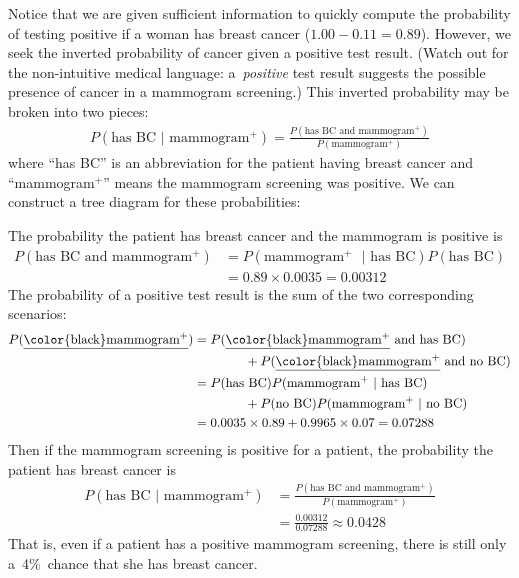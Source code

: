 \begin{examplewrap}
\begin{nexample}
Notice that we are given sufficient information to quickly compute the probability of testing positive if a woman has breast cancer ($1.00-0.11=0.89$). However, we seek the inverted probability of cancer given a positive test result. (Watch out for the non-intuitive medical language: a~\emph{positive} test result suggests the possible presence of cancer in a mammogram screening.) This inverted probability may be broken into two pieces:
\begin{align*}
P(\text{has BC } | \text{ mammogram$^+$}) = \frac{P(\text{has BC and mammogram$^+$})}{P(\text{mammogram$^+$})}
\end{align*}
where ``has BC'' is an abbreviation for the patient having
breast cancer and ``mammogram$^+$'' means the mammogram screening
was positive.
We can construct a tree diagram for these probabilities:
\begin{center}
\end{center}
The probability the patient has breast cancer
and the mammogram is positive is
\begin{align*}
P(\text{has BC and mammogram$^+$}) &= P(\text{mammogram$^+$ } | \text{ has BC})P(\text{has BC}) \\
	&= 0.89\times 0.0035 = 0.00312
\end{align*}
The probability of a positive test result is the sum of the two corresponding scenarios:
\begin{align*}
P(\text{\underline{\color{black}mammogram$^+$}})
  &= P(\text{\underline{\color{black}mammogram$^+$} and has BC}) \\
  &\qquad\qquad
      + P(\text{\underline{\color{black}mammogram$^+$} and no BC})\\
  &= P(\text{has BC})P(\text{mammogram$^+$ } | \text{ has BC}) \\
  &\qquad\qquad
      + P(\text{no BC})P(\text{mammogram$^+$ } | \text{ no BC}) \\
  &= 0.0035\times 0.89 + 0.9965\times 0.07 = 0.07288
\end{align*}
Then if the mammogram screening is positive for a patient, the probability the patient has breast cancer is
\begin{align*}
P(\text{has BC } | \text{ mammogram$^+$})
	&= \frac{P(\text{has BC and mammogram$^+$})}{P(\text{mammogram$^+$})}\\
	&= \frac{0.00312}{0.07288} \approx 0.0428
\end{align*}
That is, even if a patient has a positive mammogram screening, there is still only a~4\%~chance that she has breast cancer.
\end{nexample}
\end{examplewrap}


